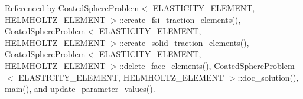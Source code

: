 Referenced by Coated\+Sphere\+Problem$<$ E\+L\+A\+S\+T\+I\+C\+I\+T\+Y\+\_\+\+E\+L\+E\+M\+E\+N\+T, H\+E\+L\+M\+H\+O\+L\+T\+Z\+\_\+\+E\+L\+E\+M\+E\+N\+T $>$\+::create\+\_\+fsi\+\_\+traction\+\_\+elements(), Coated\+Sphere\+Problem$<$ E\+L\+A\+S\+T\+I\+C\+I\+T\+Y\+\_\+\+E\+L\+E\+M\+E\+N\+T, H\+E\+L\+M\+H\+O\+L\+T\+Z\+\_\+\+E\+L\+E\+M\+E\+N\+T $>$\+::create\+\_\+solid\+\_\+traction\+\_\+elements(), Coated\+Sphere\+Problem$<$ E\+L\+A\+S\+T\+I\+C\+I\+T\+Y\+\_\+\+E\+L\+E\+M\+E\+N\+T, H\+E\+L\+M\+H\+O\+L\+T\+Z\+\_\+\+E\+L\+E\+M\+E\+N\+T $>$\+::delete\+\_\+face\+\_\+elements(), Coated\+Sphere\+Problem$<$ E\+L\+A\+S\+T\+I\+C\+I\+T\+Y\+\_\+\+E\+L\+E\+M\+E\+N\+T, H\+E\+L\+M\+H\+O\+L\+T\+Z\+\_\+\+E\+L\+E\+M\+E\+N\+T $>$\+::doc\+\_\+solution(), main(), and update\+\_\+parameter\+\_\+values().

